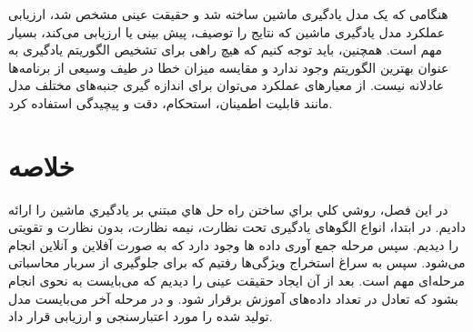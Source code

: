 هنگامی که یک مدل یادگیری ماشین ساخته شد و حقیقت عینی مشخص شد، ارزیابی عملکرد مدل یادگیری ماشین که نتایج را توصیف، پیش بینی یا ارزیابی می‌کند، بسیار مهم است. همچنین، باید توجه کنیم که هیچ راهی برای تشخیص الگوریتم یادگیری به عنوان بهترین الگوریتم وجود ندارد و مقایسه میزان خطا در طیف وسیعی از برنامه‌ها عادلانه نیست. از معیارهای عملکرد می‌توان برای اندازه گیری جنبه‌های مختلف مدل مانند قابلیت اطمینان، استحکام، دقت و پیچیدگی استفاده کرد.


\newpage

\section{خلاصه}


در این فصل، روشي كلي براي ساختن راه حل هاي مبتني بر يادگيري ماشين را ارائه دادیم. در ابتدا، انواع الگوهای یادگیری تحت نظارت، نیمه نظارت، بدون نظارت و تقویتی را دیدیم. سپس مرحله جمع آوری داده ها وجود دارد که به صورت آفلاین و آنلاین انجام می‌شود. سپس به سراغ استخراج ویژگی‌ها رفتیم که برای جلوگیری از سربار محاسباتی مرحله‌ای مهم است. بعد از آن ایجاد حقیقت عینی را دیدیم که می‌بایست به نحوی انجام بشود که تعادل در تعداد داده‌های آموزش برقرار شود. و در مرحله آخر می‌بایست مدل تولید شده را مورد اعتبارسنجی و ارزیابی قرار داد.

